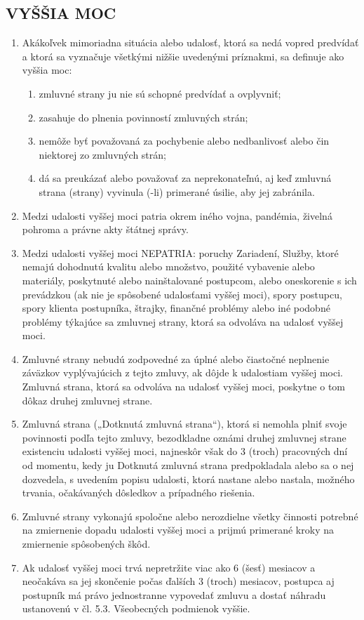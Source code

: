 \documentclass[a4paper]{article}
\begin{document}
\begin{multicols}{2}
\subsection{VYŠŠIA MOC}
\begin{enumerate}
    \item Akákoľvek mimoriadna situácia alebo udalosť, ktorá sa nedá vopred predvídať a ktorá sa vyznačuje všetkými nižšie uvedenými príznakmi, sa definuje ako vyššia moc:
    \begin{enumerate}
        \item zmluvné strany ju nie sú schopné predvídať a ovplyvniť;
        \item zasahuje do plnenia povinností zmluvných strán;
        \item nemôže byť považovaná za pochybenie alebo nedbanlivosť alebo čin niektorej zo zmluvných strán; 
        \item dá sa preukázať alebo považovať za neprekonateľnú, aj keď zmluvná strana (strany) vyvinula (-li) primerané úsilie, aby jej zabránila.
    \end{enumerate}
    \item Medzi udalosti vyššej moci patria okrem iného vojna, pandémia, živelná pohroma a právne akty štátnej správy.
    \item Medzi udalosti vyššej moci NEPATRIA: poruchy Zariadení, Služby, ktoré nemajú dohodnutú kvalitu alebo množstvo, použité vybavenie alebo materiály, poskytnuté alebo nainštalované postupcom, alebo oneskorenie s ich prevádzkou (ak nie je spôsobené udalosťami vyššej moci), spory postupcu, spory klienta postupníka, štrajky, finančné problémy alebo iné podobné problémy týkajúce sa zmluvnej strany, ktorá sa odvoláva na udalosť vyššej moci.
    \item Zmluvné strany nebudú zodpovedné za úplné alebo čiastočné neplnenie záväzkov vyplývajúcich z tejto zmluvy, ak dôjde k udalostiam vyššej moci. Zmluvná strana, ktorá sa odvoláva na udalosť vyššej moci, poskytne o tom dôkaz druhej zmluvnej strane.
    \item Zmluvná strana („Dotknutá zmluvná strana“), ktorá si nemohla plniť svoje povinnosti podľa tejto zmluvy, bezodkladne oznámi druhej zmluvnej strane existenciu udalosti vyššej moci, najneskôr však do 3 (troch) pracovných dní od momentu, kedy ju Dotknutá zmluvná strana predpokladala alebo sa o nej dozvedela, s uvedením popisu udalosti, ktorá nastane alebo nastala, možného trvania, očakávaných dôsledkov a prípadného riešenia.
    \item Zmluvné strany vykonajú spoločne alebo nerozdielne všetky činnosti potrebné na zmiernenie dopadu udalosti vyššej moci a prijmú primerané kroky na zmiernenie spôsobených škôd. 
    \item Ak udalosť vyššej moci trvá nepretržite viac ako 6 (šesť) mesiacov a neočakáva sa jej skončenie počas ďalších 3 (troch) mesiacov, postupca aj postupník má právo jednostranne vypovedať zmluvu a dostať náhradu ustanovenú v čl. 5.3. Všeobecných podmienok vyššie.
\end{enumerate}

\end{multicols}
\end{document}
